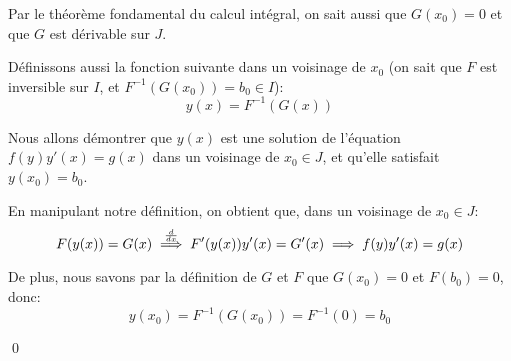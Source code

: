 \documentclass[a4paper]{article}
\begin{document}
{{        Par le théorème fondamental du calcul intégral, on sait aussi que $G\left(x_0\right) = 0$ et que $G$ est dérivable sur $J$.

        Définissons aussi la fonction suivante dans un voisinage de $x_0$ (on sait que $F$ est inversible sur $I$, et $F^{-1}\left(G\left(x_0\right)\right) = b_0 \in I$): 
        \[y\left(x\right) = F^{-1}\left(G\left(x\right)\right)\]
        
        Nous allons démontrer que $y\left(x\right)$ est une solution de l'équation $f\left(y\right) y'\left(x\right) = g\left(x\right)$ dans un voisinage de $x_0 \in J$, et qu'elle satisfait $y\left(x_0\right) = b_0$.

        En manipulant notre définition, on obtient que, dans un voisinage de $x_0 \in J$: 
        \[F\left(y\left(x\right)\right) = G\left(x\right) \over{\implies}{$\frac{d}{dx}$}  F'\left(y\left(x\right)\right) y'\left(x\right) = G'\left(x\right) \implies f\left(y\right)y'\left(x\right) =  g\left(x\right)\]

        De plus, nous savons par la définition de $G$ et $F$ que $G\left(x_0\right) = 0$ et $F\left(b_0\right) = 0$, donc:
        \[y\left(x_0\right) = F^{-1}\left(G\left(x_0\right)\right) = F^{-1}\left(0\right) = b_0\]

        \qed
    }


}
\end{document}
